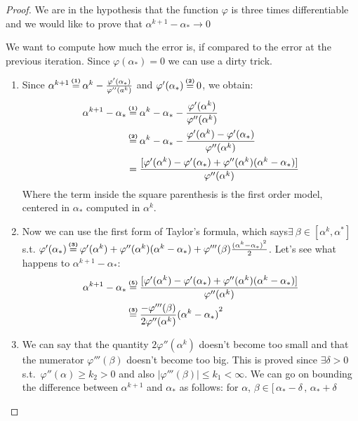 \documentclass[computational_mathematics.tex]{subfiles}
\begin{document}
\begin{proof}
  We are in the hypothesis that the function $\varphi$ is three times differentiable and we would like to prove that $\alpha^{k+1} - \alpha_* \rightarrow 0$

We want to compute how much the error is, if compared to the error at the previous iteration.
  Since $\varphi(\alpha_{*}) = 0$ we can use a dirty trick. 
  \begin{enumerate}
    \item Since $\alpha^{k+1} \numeq{(1)} \alpha^k - \frac{\varphi'({\alpha}_*)}{\varphi''(a^k)}$ and $\varphi'(\alpha_*) \numeq{(2)} 0$, we obtain:
  \begin{equation}
    \begin{split}
      \alpha^{k+1} - \alpha_* & \numeq{(1)} \alpha^k - \alpha_* - \frac{\varphi'(\alpha^k)}{\varphi''(\alpha^k)}\\
      & \numeq{(2)} \alpha^k - \alpha_* - \frac{\varphi'(\alpha^k) - \varphi'(\alpha_*)}{\varphi''(\alpha^k)}\\
      & = \frac{[\varphi'(\alpha^k) -\varphi'(\alpha_*) + \varphi''(\alpha^k) (\alpha^k - \alpha_*)]}{\varphi''(\alpha^k)} 
    \end{split}
  \end{equation}
 Where the term inside the square parenthesis  is the first order model, centered in $\alpha_*$ computed in $\alpha^k$.
  \item Now we can use the first form of Taylor's formula, which says$\exists ~ \beta \in [\alpha^k, \alpha^*]$ s.t. $\varphi'(\alpha_{*}) \numeq{(3)} \varphi'(\alpha^{k}) + \varphi''(\alpha^{k}) (\alpha^{k} - \alpha_{*}) + \varphi'''(\beta) \frac{{(\alpha^{k} - \alpha_{*})}^{2}}{2}$.
    Let's see what happens to $\alpha^{k+1} - \alpha_*$:
  \begin{equation}
    \begin{split}
      \alpha^{k+1} - \alpha_* & \numeq{(5)} \frac{[\varphi'(\alpha^k) -\varphi'(\alpha_*) + \varphi''(\alpha^k) (\alpha^k - \alpha_*)]}{\varphi''(\alpha^k)}\\
      & \numeq{(3)} \frac{-\varphi'''(\beta)}{2 \varphi''(\alpha^k)} {(\alpha^k - \alpha_*)}^2
    \end{split}
  \end{equation}
\item We can say that the quantity $2\varphi''(\alpha^{k})$ doesn't become too small and that the numerator $\varphi'''(\beta)$ doesn't become too big. This is proved since $\exists \delta > 0$ s.t.~$\varphi''(\alpha) \geq k_2 > 0$ and also  $| \varphi'''(\beta) | \leq k_1 < \infty$. We can go on bounding the difference between $\alpha^{k+1}$ and $\alpha_*$ as follows: for $\alpha$, $\beta \in [ \, \alpha_* - \delta \,,\, \alpha_* + \delta$
       

\end{enumerate}
\end{proof}
\end{document}
